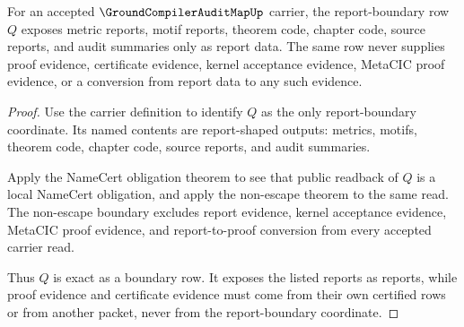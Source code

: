 \begin{theorem}
\label{thm:ground-compiler-audit-map-report-boundary-exactness}
For an accepted $\GroundCompilerAuditMapUp$ carrier, the report-boundary row $Q$ exposes metric reports, motif reports, theorem code, chapter code, source reports, and audit summaries only as report data. The same row never supplies proof evidence, certificate evidence, kernel acceptance evidence, MetaCIC proof evidence, or a conversion from report data to any such evidence.
\end{theorem}
\begin{proof}
Use the carrier definition to identify $Q$ as the only report-boundary coordinate. Its named contents are report-shaped outputs: metrics, motifs, theorem code, chapter code, source reports, and audit summaries.

Apply the NameCert obligation theorem to see that public readback of $Q$ is a local NameCert obligation, and apply the non-escape theorem to the same read. The non-escape boundary excludes report evidence, kernel acceptance evidence, MetaCIC proof evidence, and report-to-proof conversion from every accepted carrier read.

Thus $Q$ is exact as a boundary row. It exposes the listed reports as reports, while proof evidence and certificate evidence must come from their own certified rows or from another packet, never from the report-boundary coordinate.
\end{proof}

